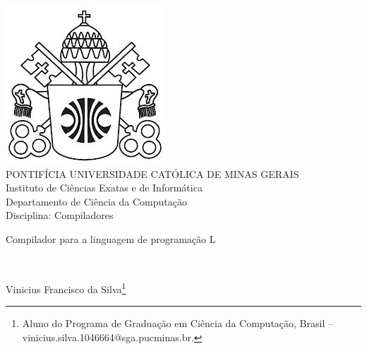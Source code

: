 \documentclass[a4paper,12pt,Times]{article}
\makeatletter
\newcommand{\monog}{ 
\begin{center}
Compilador para a linguagem de programação L    
\end{center}}
\newcommand{\origem}{Brasil }
\newcommand{\AutorA}{Vinicius Francisco da Silva}
\newcommand{\funcaoA}{}
\newcommand{\emailA}{vinicius.silva.1046664@sga.pucminas.br}
\newcommand{\cursA}{Aluno do Programa de Graduação em Ciência da Computação}
\newcommand{\keyword}[1]{\textsf{#1}}
\makeatother
\begin{document}

\begin{center}
\includegraphics[scale=0.2]{figuras/brasao.jpg} \\
PONTIFÍCIA UNIVERSIDADE CATÓLICA DE MINAS GERAIS \\
Instituto de Ciências Exatas e de Informática \\
Departamento de Ciência da Computação \\
Disciplina: Compiladores


\end{center}

 \vspace{0cm} {
 	\singlespacing \Large{\monog {} \\ }
 }

\vspace{1.0cm}

\begin{flushright}
\singlespacing 
\normalsize{\AutorA \footnote{\funcaoA \cursA, \origem -- \emailA . }}
\end{flushright}
\thispagestyle{empty}

\vspace{1.0cm}




 \onehalfspace  %
 \setlength{\parindent}{1.25cm}





%

%

\end{document}
